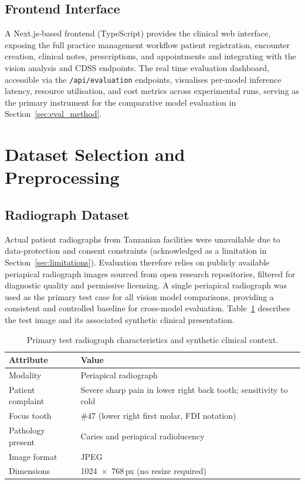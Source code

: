 \documentclass[12pt,a4paper]{report}
\begin{document}
\subsection{Frontend Interface}
\label{subsec:frontend}

A Next.js-based frontend (TypeScript) provides the clinical web
interface, exposing the full practice management workflow patient
registration, encounter creation, clinical notes, prescriptions, and
appointments and integrating with the vision analysis and CDSS
endpoints.  The real time evaluation dashboard, accessible via the
\texttt{/api/evaluation} endpoints, visualises per-model inference
latency, resource utilisation, and cost metrics across experimental
runs, serving as the primary instrument for the comparative model
evaluation in Section~\ref{sec:eval_method}.

\section{Dataset Selection and Preprocessing}
\label{sec:datasets}

\subsection{Radiograph Dataset}
\label{subsec:images}

Actual patient radiographs from Tanzanian facilities were unavailable
due to data-protection and consent constraints (acknowledged as a
limitation in Section~\ref{sec:limitations}).  Evaluation therefore relies on
publicly available periapical radiograph images sourced from open
research repositories, filtered for diagnostic quality and permissive
licensing.  A single periapical radiograph was used as the primary test
case for all vision model comparisons, providing a consistent and
controlled baseline for cross-model evaluation.
Table~\ref{tab:test_image} describes the test image and its associated
synthetic clinical presentation.

\begin{table}[H]
\centering
\caption{Primary test radiograph characteristics and synthetic clinical context.}
\label{tab:test_image}
\small
\begin{tabular}{@{}ll@{}}
\toprule
\textbf{Attribute} & \textbf{Value} \\
\midrule
Modality            & Periapical radiograph \\
Patient complaint   & Severe sharp pain in lower right back tooth; sensitivity to cold \\
Focus tooth         & \#47 (lower right first molar, FDI notation) \\
Pathology present   & Caries and periapical radiolucency \\
Image format        & JPEG \\
Dimensions          & 1024~$\times$~768\,px (no resize required) \\
\bottomrule
\end{tabular}
\end{table}
\end{document}
